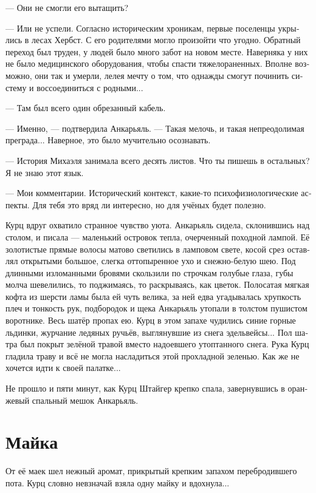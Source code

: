 \documentclass[a4paper,10pt,fleqn]{book}\usepackage{polyglossia}\setdefaultlanguage[babelshorthands=true]{russian}\setotherlanguage{english}\defaultfontfeatures{Ligatures=TeX,Mapping=tex-text}\usepackage{xcolor}\newcommand{\ml}[3]{#2}
\begin{document}
--- Они не смогли его вытащить?

--- Или не успели.
Согласно историческим хроникам, первые поселенцы укрылись в лесах Хербст.
С его родителями могло произойти что угодно.
Обратный переход был труден, у людей было много забот на новом месте.
Наверняка у них не было медицинского оборудования, чтобы спасти тяжелораненных.
Вполне возможно, они так и умерли, лелея мечту о том, что однажды смогут починить систему и воссоединиться с родными...

--- Там был всего один обрезанный кабель.

--- Именно, --- подтвердила Анкарьяль.
--- Такая мелочь, и такая непреодолимая преграда...
Наверное, это было мучительно осознавать.

--- История Михаэля занимала всего десять листов.
Что ты пишешь в остальных?
Я не знаю этот язык.

--- Мои комментарии.
Исторический контекст, какие-то психофизиологические аспекты.
Для тебя это вряд ли интересно, но для учёных будет полезно.

Курц вдруг охватило странное чувство уюта.
Анкарьяль сидела, склонившись над столом, и писала --- маленький островок тепла, очерченный походной лампой.
Её золотистые прямые волосы матово светились в ламповом свете, косой срез оставлял открытыми большое, слегка оттопыренное ухо и снежно-белую шею.
Под длинными изломанными  бровями скользили по строчкам голубые глаза, губы молча шевелились, то поджимаясь, то раскрываясь, как цветок.
Полосатая мягкая кофта из шерсти ламы была ей чуть велика, за ней едва угадывалась хрупкость плеч и тонкость рук, подбородок и щека Анкарьяль утопали в толстом пушистом воротнике.
Весь шатёр пропах ею.
Курц в этом запахе чудились синие горные льдинки, журчание ледяных ручьёв, выглянувшие из снега эдельвейсы...
Пол шатра был покрыт зелёной травой вместо надоевшего утоптанного снега.
Рука Курц гладила траву и всё не могла насладиться этой прохладной зеленью.
Как же не хочется идти к своей палатке...

Не прошло и пяти минут, как Курц Штайгер крепко спала, завернувшись в оранжевый спальный мешок Анкарьяль.

\section{Майка}

От её маек шел нежный аромат, прикрытый крепким запахом перебродившего пота.
Курц словно невзначай взяла одну майку и вдохнула...
\end{document}
